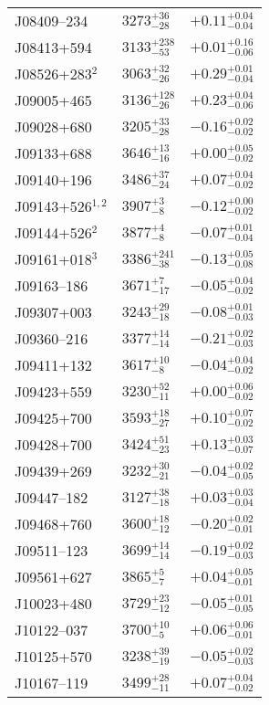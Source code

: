 \documentclass{aa}
\begin{document}
\begin{appendix}
\begin{center}
\begin{xtabular}{lll}
J08409--234 & $3273_{-28}^{+36}$ & $+0.11_{-0.04}^{+0.04}$ \\
J08413+594 & $3133_{-53}^{+238}$ & $+0.01_{-0.06}^{+0.16}$ \\
J08526+283$^{2}$ & $3063_{-26}^{+32}$ & $+0.29_{-0.04}^{+0.01}$ \\
J09005+465 & $3136_{-26}^{+128}$ & $+0.23_{-0.06}^{+0.04}$ \\
J09028+680 & $3205_{-28}^{+33}$ & $-0.16_{-0.02}^{+0.02}$ \\
J09133+688 & $3646_{-16}^{+13}$ & $+0.00_{-0.02}^{+0.05}$ \\
J09140+196 & $3486_{-24}^{+37}$ & $+0.07_{-0.02}^{+0.04}$ \\
J09143+526$^{1,2}$ & $3907_{-8}^{+3}$ & $-0.12_{-0.02}^{+0.00}$ \\
J09144+526$^{2}$ & $3877_{-8}^{+4}$ & $-0.07_{-0.04}^{+0.01}$ \\
J09161+018$^{3}$ & $3386_{-38}^{+241}$ & $-0.13_{-0.08}^{+0.05}$ \\
J09163--186 & $3671_{-17}^{+7}$ & $-0.05_{-0.02}^{+0.04}$ \\
J09307+003 & $3243_{-18}^{+29}$ & $-0.08_{-0.03}^{+0.01}$ \\
J09360--216 & $3377_{-14}^{+14}$ & $-0.21_{-0.03}^{+0.02}$ \\
J09411+132 & $3617_{-8}^{+10}$ & $-0.04_{-0.02}^{+0.04}$ \\
J09423+559 & $3230_{-11}^{+52}$ & $+0.00_{-0.02}^{+0.06}$ \\
J09425+700 & $3593_{-27}^{+18}$ & $+0.10_{-0.02}^{+0.07}$ \\
J09428+700 & $3424_{-23}^{+51}$ & $+0.13_{-0.07}^{+0.03}$ \\
J09439+269 & $3232_{-21}^{+30}$ & $-0.04_{-0.05}^{+0.02}$ \\
J09447--182 & $3127_{-18}^{+38}$ & $+0.03_{-0.04}^{+0.03}$ \\
J09468+760 & $3600_{-12}^{+18}$ & $-0.20_{-0.01}^{+0.02}$ \\
J09511--123 & $3699_{-14}^{+14}$ & $-0.19_{-0.03}^{+0.02}$ \\
J09561+627 & $3865_{-7}^{+5}$ & $+0.04_{-0.01}^{+0.05}$ \\
J10023+480 & $3729_{-12}^{+23}$ & $-0.05_{-0.05}^{+0.01}$ \\
J10122--037 & $3700_{-5}^{+10}$ & $+0.06_{-0.01}^{+0.06}$ \\
J10125+570 & $3238_{-19}^{+39}$ & $-0.05_{-0.03}^{+0.02}$ \\
J10167--119 & $3499_{-11}^{+28}$ & $+0.07_{-0.02}^{+0.04}$ \\

\end{xtabular}
\end{center}
\end{appendix}
\end{document}
